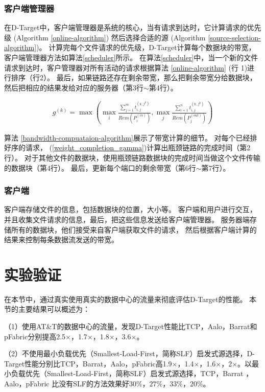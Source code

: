 \subsubsection{客户端管理器}
在D-Target中，客户端管理器是系统的核心，当有请求到达时，它计算请求的优先级 (Algorithm \ref{online-algorithm}) 然后选择合适的源 (Algorithm \ref{source-selection-algorithm})。
计算完每个文件请求的优先级，D-Target计算每个数据块的带宽，客户端管理器方法如算法\ref{scheduler}所示。
在算法\ref{scheduler}中，当一个新的文件请求到达时，客户管理器对所有活动的请求根据算法 \ref{online-algorithm} (行 1)进行排序（行2）。
最后，如果链路还存在剩余带宽，那么把剩余带宽分给数据块，然后把相应的结果发给对应的服务器（第3行$\sim$第4行）。

\begin{eqnarray} \label{weight_completion_gamma}
g^{(k)}=\max(\max \limits_i \frac{ \sum_{j=1}^mt_{i,j}^{(k,f^k)}}{Rem(P_i^{(in)})},\max \limits_j \frac{ \sum_{i=1}^nt_{i,j}^{(k,f^k)}}{Rem(P_j^{(out)})})
\end{eqnarray}

算法 \ref{bandwidth-compuataion-algorithm}展示了带宽计算的细节。
对每个已经排好序的请求， (\ref{weight_completion_gamma})计算出瓶颈链路的完成时间（第2行）。
对于其他文件的数据块，使用瓶颈链路数据块的完成时间当做这个文件传输的数据块（第4行）。
最后，更新每个端口的剩余带宽（第6行$\sim$第7行）。

\subsubsection{客户端}
客户端存储文件的信息，包括数据块的位置，大小等。
客户端和用户进行交互，并且收集文件请求的信息，最后，把这些信息发送给客户端管理器。
服务器端存储所有的数据块，他们接受来自客户端获取文件的请求，
然后根据客户端计算的结果来控制每条数据流发送的带宽。


\section{实验验证}
\label{erasure_coding:evaluation}
在本节中，通过真实使用真实的数据中心的流量来彻底评估D-Target的性能。
本节的主要结果可以概述为：

（1）使用AT\&T的数据中心的流量，发现D-Target性能比TCP，Aalo\cite{chowdhury2015efficient}，Barrat\cite{dogar2014decentralized}和pFabric\cite{pFabric}分别提高2.5$\times$，1.7$\times$，1.8$\times$，3.6$\times$。

（2）不使用最小负载优先（Smallest-Load-First，简称SLF）启发式源选择，D-Target性能分别比TCP，Barrat，Aalo，pFabric高1.9$\times$，1.4$\times$，1.6$\times$，2$\times$。以最小负载优先（Smallest-Load-First，简称SLF）启发式源选择，TCP，Barrat \cite{dogar2014decentralized}，Aalo\cite{chowdhury2015efficient}，pFabric \cite{pFabric}比没有SLF的方法效果好$30\%$，$27\%$，$33\%$，$20\%$。

